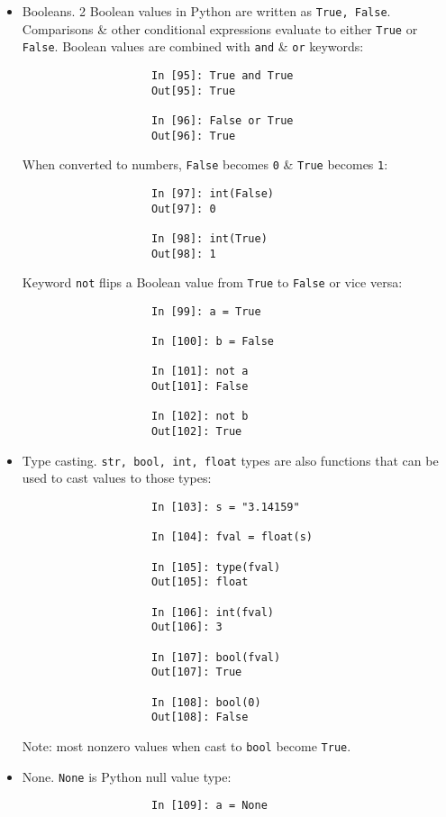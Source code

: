 \documentclass{article}
\begin{document}
\begin{itemize}
\begin{itemize}
\begin{itemize}
\begin{itemize}
\begin{verbatim}
					In [94]: val.encode("utf-16le")
					Out[94]: b'e\x00s\x00p\x00a\x00\xf1\x00o\x00l\x00'
				\end{verbatim}
				Most common to encounter {\tt bytes} object in context of working with files, where implicitly decoding all data to Unicode strings may not be desired.
				\item {\sf Booleans.} 2 Boolean values in Python are written as {\tt True, False}. Comparisons \& other conditional expressions evaluate to either {\tt True} or {\tt False}. Boolean values are combined with {\tt and} \& {\tt or} keywords:
				\begin{verbatim}
					In [95]: True and True
					Out[95]: True
					
					In [96]: False or True
					Out[96]: True
				\end{verbatim}
				When converted to numbers, {\tt False} becomes {\tt0} \& {\tt True} becomes {\tt1}:
				\begin{verbatim}
					In [97]: int(False)
					Out[97]: 0
					
					In [98]: int(True)
					Out[98]: 1
				\end{verbatim}
				Keyword {\tt not} flips a Boolean value from {\tt True} to {\tt False} or vice versa:
				\begin{verbatim}
					In [99]: a = True
					
					In [100]: b = False
					
					In [101]: not a
					Out[101]: False
					
					In [102]: not b
					Out[102]: True
				\end{verbatim}
				\item {\sf Type casting.} {\tt str, bool, int, float} types are also functions that can be used to cast values to those types:
				\begin{verbatim}
					In [103]: s = "3.14159"
					
					In [104]: fval = float(s)
					
					In [105]: type(fval)
					Out[105]: float
					
					In [106]: int(fval)
					Out[106]: 3
					
					In [107]: bool(fval)
					Out[107]: True
					
					In [108]: bool(0)
					Out[108]: False
				\end{verbatim}
				Note: most nonzero values when cast to {\tt bool} become {\tt True}.
				\item {\sf None.} {\tt None} is Python null value type:
				\begin{verbatim}
					In [109]: a = None
					

\end{verbatim}
\end{itemize}
\end{itemize}
\end{itemize}
\end{itemize}
\end{document}
